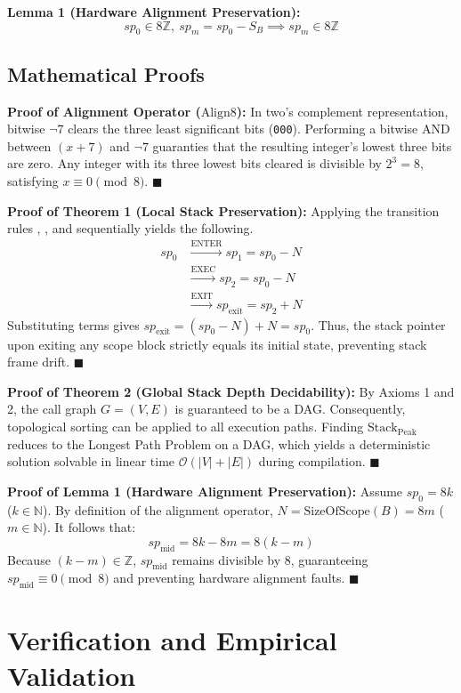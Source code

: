 \documentclass[conference]{IEEEtran}
\begin{document}
\textbf{Lemma 1 (Hardware Alignment Preservation):}
{\[sp_0 \in 8\mathbb{Z}, \ sp_m = sp_0 - S_B \implies sp_m \in 8\mathbb{Z}\]
}
\subsection{Mathematical Proofs}

\textbf{Proof of Alignment Operator ($\mathrm{Align8}$):}
In two's complement representation, bitwise $\neg 7$ clears the three least significant bits (\texttt{000}). Performing a bitwise AND between $(x + 7)$ and $\neg 7$ guaranties that the resulting integer's lowest three bits are zero. Any integer with its three lowest bits cleared is divisible by $2^3 = 8$, satisfying $x \equiv 0 \pmod 8$. $\blacksquare$

\textbf{Proof of Theorem 1 (Local Stack Preservation):}
Applying the transition rules \text{[E-ENTER]}, \text{[E-EXEC]}, and \text{[E-EXIT]} sequentially yields the following.
\[
\begin{aligned}
sp_0 &\xrightarrow{\text{ENTER}} sp_1 = sp_0 - N \\
     &\xrightarrow{\text{EXEC}}  sp_2 = sp_0 - N \\
     &\xrightarrow{\text{EXIT}}  sp_{\text{exit}} = sp_2 + N
\end{aligned}
\]
Substituting terms gives $sp_{\text{exit}} = (sp_0 - N) + N = sp_0$. Thus, the stack pointer upon exiting any scope block strictly equals its initial state, preventing stack frame drift. $\blacksquare$

\textbf{Proof of Theorem 2 (Global Stack Depth Decidability):}
By Axioms 1 and 2, the call graph $G = (V, E)$ is guaranteed to be a DAG. Consequently, topological sorting can be applied to all execution paths. Finding $\mathrm{Stack}_{\mathrm{Peak}}$ reduces to the Longest Path Problem on a DAG, which yields a deterministic solution solvable in linear time $\mathcal{O}(|V| + |E|)$ during compilation. $\blacksquare$

\textbf{Proof of Lemma 1 (Hardware Alignment Preservation):}
Assume $sp_0 = 8k$ ($k \in \mathbb{N}$). By definition of the alignment operator, $N = \mathrm{SizeOfScope}(B) = 8m$ ($m \in \mathbb{N}$). It follows that:
\[sp_{\text{mid}} = 8k - 8m = 8(k - m)\]
Because $(k - m) \in \mathbb{Z}$, $sp_{\text{mid}}$ remains divisible by 8, guaranteeing $sp_{\text{mid}} \equiv 0 \pmod 8$ and preventing hardware alignment faults. $\blacksquare$

\section{Verification and Empirical Validation}
\end{document}
